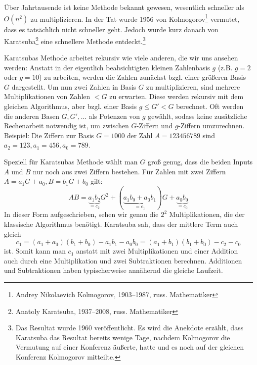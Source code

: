 
\begin{remark}
    Über Jahrtausende ist keine Methode bekannt gewesen, wesentlich schneller als $O(n^2)$ zu multiplizieren. In der Tat wurde 1956 von Kolmogorov\footnote{Andrey Nikolaevich Kolmogorov, 1903--1987, russ. Mathematiker} vermutet, dass es tatsächlich nicht schneller geht. Jedoch wurde kurz danach von Karatsuba\footnote{Anatoly Karatsuba, 1937--2008, russ. Mathematiker} eine schnellere Methode entdeckt.\footnote{Das Resultat wurde 1960 veröffentlicht. Es wird die Anekdote erzählt, dass Karatsuba das Resultat bereits wenige Tage, nachdem Kolmogorov die Vermutung auf einer Konferenz äußerte, hatte und es noch auf der gleichen Konferenz Kolmogorov mitteilte.}

    \medskip
    Karatsubas Methode arbeitet rekursiv wie viele anderen, die wir uns ansehen werden: Anstatt in der eigentlich beabsichtigten kleinen Zahlenbasis $g$ (z.B. $g=2$ oder $g=10$) zu arbeiten, werden die Zahlen zunächst bzgl. einer größeren Basis $G$ dargestellt. Um nun zwei Zahlen in Basis $G$ zu multiplizieren, sind mehrere Multiplikationen von Zahlen $<G$ zu erwarten. Diese werden rekursiv mit dem gleichen Algorithmus, aber bzgl. einer Basis $g\leq G'<G$ berechnet. Oft werden die anderen Basen $G,G', \ldots$ als Potenzen von $g$ gewählt, sodass keine zusätzliche Rechenarbeit notwendig ist, um zwischen $G$-Ziffern und $g$-Ziffern umzurechnen. Beispiel: Die Ziffern zur Basis $G=1000$ der Zahl $A=123456789$ sind $a_2=123, a_1=456, a_0=789$.

    \medskip
    Speziell für Karatsubas Methode wählt man $G$ groß genug, dass die beiden Inputs $A$ und $B$ nur noch aus zwei Ziffern bestehen. Für Zahlen mit zwei Ziffern $A=a_1G+a_0, B=b_1G+b_0$ gilt:
    \[AB = \underbrace{a_1 b_2}_{=c_2} G^2 + (\underbrace{a_1 b_0+a_0 b_1}_{=c_1})G+\underbrace{a_0 b_0}_{=c_0}\]
    In dieser Form aufgeschrieben, sehen wir genau die $2^2$ Multiplikationen, die der klassische Algorithmus benötigt. Karatsuba sah, dass der mittlere Term auch gleich
    \[c_1 = (a_1+a_0)(b_1+b_0)-a_1 b_1-a_0b_0 = (a_1+b_1)(b_1+b_0)-c_2-c_0\]
    ist. Somit kann man $c_1$ anstatt mit zwei Multiplikationen und einer Addition auch durch eine Multiplikation und zwei Subtraktionen berechnen. Additionen und Subtraktionen haben typischerweise annähernd die gleiche Laufzeit.
\end{remark}

